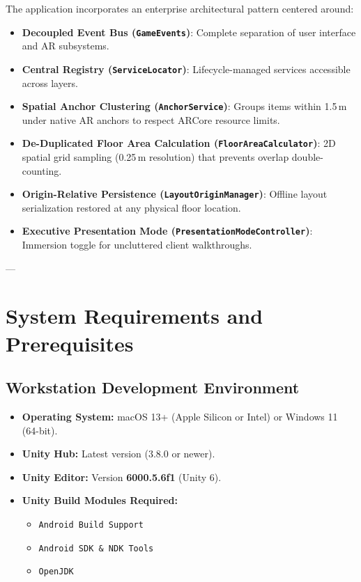 \documentclass[11pt,a4paper]{article}
\begin{document}
The application incorporates an enterprise architectural pattern centered around:
\begin{itemize}[noitemsep]
    \item \textbf{Decoupled Event Bus (\texttt{GameEvents})}: Complete separation of user interface and AR subsystems.
    \item \textbf{Central Registry (\texttt{ServiceLocator})}: Lifecycle-managed services accessible across layers.
    \item \textbf{Spatial Anchor Clustering (\texttt{AnchorService})}: Groups items within 1.5\,m under native AR anchors to respect ARCore resource limits.
    \item \textbf{De-Duplicated Floor Area Calculation (\texttt{FloorAreaCalculator})}: 2D spatial grid sampling (0.25\,m resolution) that prevents overlap double-counting.
    \item \textbf{Origin-Relative Persistence (\texttt{LayoutOriginManager})}: Offline layout serialization restored at any physical floor location.
    \item \textbf{Executive Presentation Mode (\texttt{PresentationModeController})}: Immersion toggle for uncluttered client walkthroughs.
\end{itemize}

---

\section{System Requirements and Prerequisites}

\subsection{Workstation Development Environment}
\begin{itemize}
    \item \textbf{Operating System:} macOS 13+ (Apple Silicon or Intel) or Windows 11 (64-bit).
    \item \textbf{Unity Hub:} Latest version (3.8.0 or newer).
    \item \textbf{Unity Editor:} Version \textbf{6000.5.6f1} (Unity 6).
    \item \textbf{Unity Build Modules Required:}
    \begin{itemize}[noitemsep]
        \item \texttt{Android Build Support}
        \item \texttt{Android SDK \& NDK Tools}
        \item \texttt{OpenJDK}
    \end{itemize}
\end{itemize}
\end{document}
